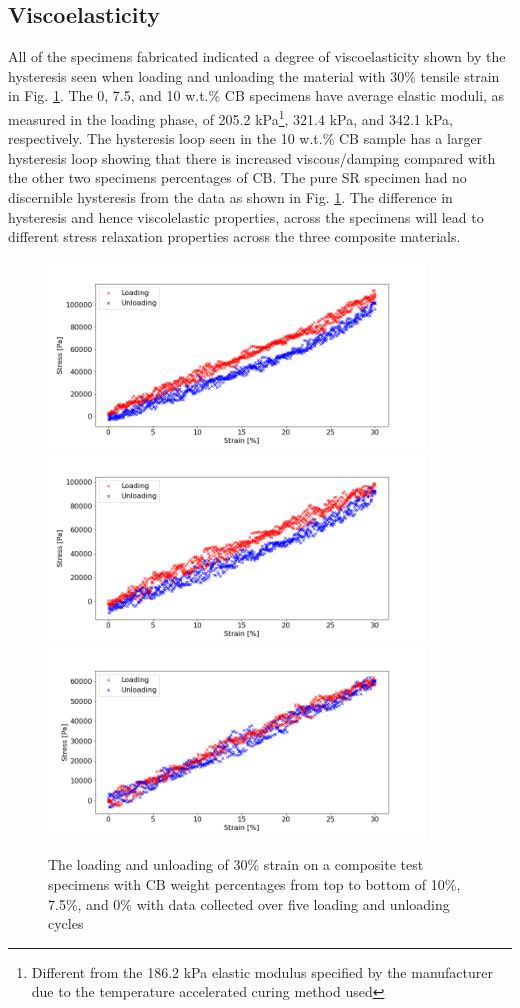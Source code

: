 \subsection{Viscoelasticity}
All of the specimens fabricated indicated a degree of viscoelasticity shown by the hysteresis seen when loading and unloading the material with 30\% tensile strain in Fig. \ref{fig:loading-and-unloading-specimens}. The 0, 7.5, and 10 w.t.\% CB specimens have average elastic moduli, as measured in the loading phase, of 205.2 kPa\footnote{Different from the 186.2 kPa elastic modulus specified by the manufacturer due to the temperature accelerated curing method used}, 321.4 kPa, and 342.1 kPa, respectively. The hysteresis loop seen in the 10 w.t.\% CB sample has a larger hysteresis loop showing that there is increased viscous/damping compared with the other two specimens percentages of CB. The pure SR specimen had no discernible hysteresis from the data as shown in Fig. \ref{fig:loading-and-unloading-specimens}.  The difference in hysteresis and hence viscolelastic properties, across the specimens will lead to different stress relaxation properties across the three composite materials.
\begin{figure}[H]
	\centering
	\includegraphics[width=10cm]{Figures/load_unload_1_10_E4pin_20mm_v9_0.3Strain.png}
	\includegraphics[width=10cm]{Figures/load_unload_2_7-5_E4pin_20mm_v10_0.3Strain.png}
	\includegraphics[width=10cm]{Figures/load_unload_1_CB0_v1_0.3Strain.png}
	\caption{The loading and unloading of 30\% strain on a composite test specimens with CB weight percentages from top to bottom of 10\%, 7.5\%, and 0\% with data collected over five loading and unloading cycles}
	\label{fig:loading-and-unloading-specimens}
\end{figure}


